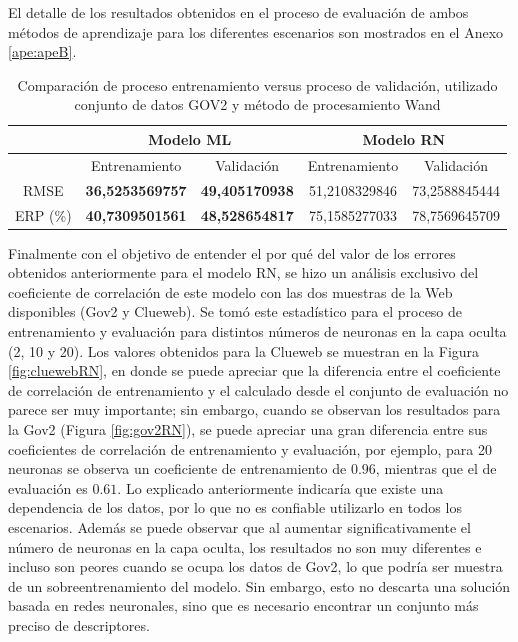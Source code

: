 El detalle de los resultados obtenidos en el proceso de evaluación de ambos métodos de aprendizaje para los diferentes escenarios son mostrados en el Anexo \ref{ape:apeB}.

\begin{table}[tp]
\caption{Comparación de proceso entrenamiento versus proceso de validación, utilizado conjunto de datos GOV2 y método de procesamiento Wand}
\begin{center}
\begin{tabular}{|c|c|c|c|c|}
\hline
 & \multicolumn{ 2}{c|}{Modelo ML} & \multicolumn{ 2}{c|}{Modelo RN } \\ \hline
 & Entrenamiento & Validación & Entrenamiento & Validación \\ \hline
RMSE & \textbf{36,5253569757} & \textbf{49,405170938} & 51,2108329846 & 73,2588845444 \\ \hline
ERP (\%) & \textbf{40,7309501561} & \textbf{48,528654817} & 75,1585277033 & 78,7569645709 \\ \hline
\end{tabular}
\end{center}
\label{validacion_modelos_gov2_wand}
\end{table}

Finalmente con el objetivo de entender el por qué del valor de los errores obtenidos anteriormente para el modelo RN, se hizo un análisis exclusivo del coeficiente de correlación de este modelo con las dos muestras de la Web disponibles (Gov2 y Clueweb). Se tomó este estadístico para el proceso de entrenamiento y evaluación para distintos números de neuronas en la capa oculta (2, 10 y 20). Los valores obtenidos para la Clueweb se muestran en la Figura \ref{fig:cluewebRN}, en donde se puede apreciar que la diferencia entre el coeficiente de correlación de entrenamiento y el calculado desde el conjunto de evaluación no parece ser muy importante; sin embargo, cuando se observan los resultados para la Gov2 (Figura \ref{fig:gov2RN}), se puede apreciar una gran diferencia entre sus coeficientes de correlación de entrenamiento y evaluación, por ejemplo, para 20 neuronas se observa un coeficiente de entrenamiento de $0.96$, mientras que el de evaluación es $0.61$. Lo explicado anteriormente indicaría que existe una dependencia de los datos, por lo que no es confiable utilizarlo en todos los escenarios. Además se puede observar que al aumentar significativamente el número de neuronas en la capa oculta, los resultados no son muy diferentes e incluso son peores cuando se ocupa los datos de Gov2, lo que podría ser muestra de un sobreentrenamiento del modelo. Sin embargo, esto no descarta una solución basada en redes neuronales, sino que es necesario encontrar un conjunto más preciso de descriptores.

